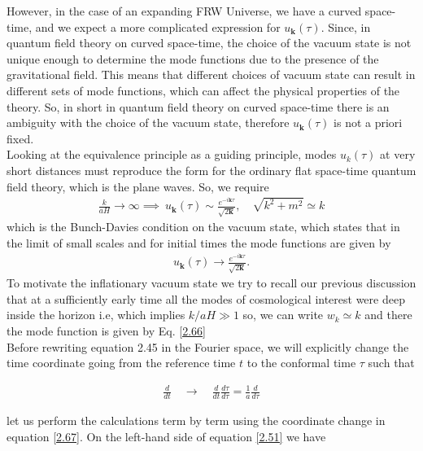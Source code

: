 However, in the case of an expanding FRW Universe, we have a curved space-time, and we expect a more complicated expression for $u_{\mathbf{k}}(\tau)$. Since, in quantum field theory on curved space-time, the choice of the vacuum state is not unique enough to determine the mode functions due to the presence of the gravitational field. This means that different choices of vacuum state can result in different sets of mode functions, which can affect the physical properties of the theory. So, in short in quantum field theory on curved space-time there is an ambiguity with the choice of the vacuum state, therefore $u_{\mathbf{k}}(\tau)$ is not a priori fixed.\\
Looking at the equivalence principle as a guiding principle, modes \(u_{k} (\tau)\) at very short distances must reproduce the form for the ordinary flat space-time quantum field theory, which is the plane waves. So, we require  \begin{align}
    \frac{k}{aH} \rightarrow \infty \implies \  u_{\mathbf{k}}(\tau) \sim \frac{e^{-i \mathbf{k} \tau}}{\sqrt{2\mathbf{k}}}, \quad \sqrt{k^{2}+m^{2}} \simeq k  \label{2.65}   
\end{align}which is the Bunch-Davies condition on the vacuum state, which states that in the limit of small scales and for initial times the mode functions are given by
\begin{align}
    u_{\mathbf{k}}(\tau) \rightarrow \frac{e^{-i \mathbf{k} \tau}} {\sqrt{2\mathbf{k}}}. \label{2.66}
\end{align}
To motivate the inflationary vacuum state we try to recall our previous discussion that at a sufficiently early time all the modes of cosmological interest were deep inside the horizon i.e, which implies $k/aH \gg 1$ so, we can write $w_{k} \simeq k$ and there the mode function is given by Eq. \ref{2.66}\\
\hspace{0.5cm} Before rewriting equation 2.45 in the Fourier space, we will explicitly change the time coordinate going from the reference time $t$ to the conformal time $\tau$ such that

\begin{align}
    \frac{d}{d t} \quad \longrightarrow \quad \frac{d}{d t} \frac{d \tau}{d \tau}=\frac{1}{a} \frac{d}{d \tau} \label{2.67}
\end{align}

let us  perform the calculations term by term using the coordinate change in equation \ref{2.67}. On the left-hand side of equation \ref{2.51} we have


